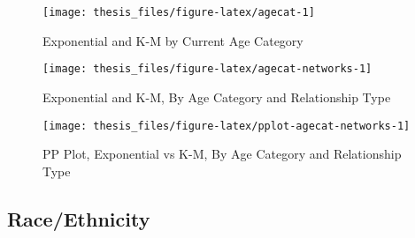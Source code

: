 \documentclass [11pt, proquest] {uwthesis}[2015/03/03]
\begin{document}
\begin{figure}

{\centering \texttt{[image: thesis\_files/figure-latex/agecat-1]} 

}

\caption{Exponential and K-M by Current Age Category}\label{fig:agecat}
\end{figure}
\begin{figure}

{\centering \texttt{[image: thesis\_files/figure-latex/agecat-networks-1]} 

}

\caption{Exponential and K-M, By Age Category and Relationship Type}\label{fig:agecat-networks}
\end{figure}
\begin{figure}

{\centering \texttt{[image: thesis\_files/figure-latex/pplot-agecat-networks-1]} 

}

\caption{PP Plot, Exponential vs K-M, By Age Category and Relationship Type}\label{fig:pplot-agecat-networks}
\end{figure}
\hypertarget{raceethnicity}{%
\subsection{Race/Ethnicity}\label{raceethnicity}}
\end{document}
